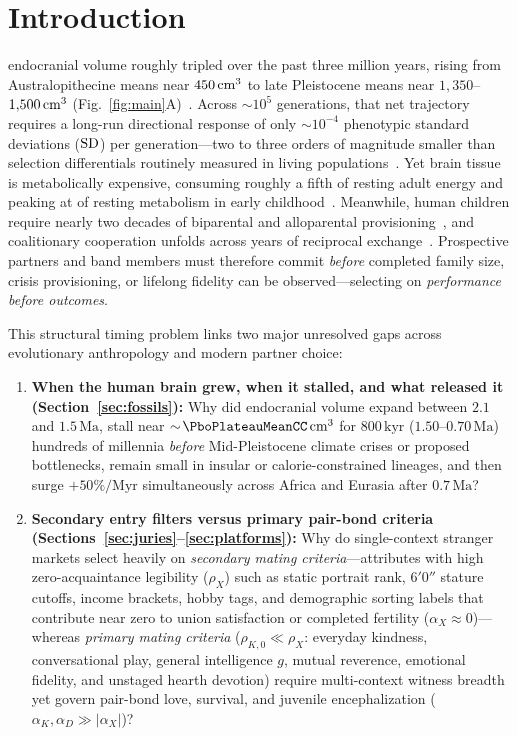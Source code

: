 
\section{Introduction}\label{sec:intro}

 endocranial volume roughly tripled over the past three million years, rising from Australopithecine means near $450\,\text{cm}^3$ to late Pleistocene means near $1{,}350$--$1{,}500\,\text{cm}^3$ (Fig.~\ref{fig:main}A)~\cite{du2018,will2021,gingerich2022}. Across $\sim\!10^5$ generations, that net trajectory requires a long-run directional response of only $\sim\!10^{-4}$ phenotypic standard deviations ($\operatorname{SD}$) per generation---two to three orders of magnitude smaller than selection differentials routinely measured in living populations~\cite{kingsolver2001}. Yet brain tissue is metabolically expensive, consuming roughly a fifth of resting adult energy and peaking at \PboChildPeakRmr{} of resting metabolism in early childhood~\cite{pontzer2016,kuzawa2014}. Meanwhile, human children require nearly two decades of biparental and alloparental provisioning~\cite{kaplan2000,marlowe2000}, and coalitionary cooperation unfolds across years of reciprocal exchange~\cite{boehm1999,gurven2004}. Prospective partners and band members must therefore commit \emph{before} completed family size, crisis provisioning, or lifelong fidelity can be observed---selecting on \emph{performance before outcomes}.

This structural timing problem links two major unresolved gaps across evolutionary anthropology and modern partner choice:
\begin{enumerate}[leftmargin=1.4em,itemsep=1.5pt,topsep=2pt]
\item \textbf{When the human brain grew, when it stalled, and what released it (Section~\ref{sec:fossils}):} Why did endocranial volume expand between $2.1$ and $1.5\,\mathrm{Ma}$, stall near $\sim\!\PboPlateauMeanCC\ccm$ for $800\,\mathrm{kyr}$ ($1.50$--$0.70\,\mathrm{Ma}$) hundreds of millennia \emph{before} Mid-Pleistocene climate crises or proposed bottlenecks, remain small in insular or calorie-constrained \Homo{} lineages, and then surge $+50\%/\mathrm{Myr}$ simultaneously across Africa and Eurasia after $0.7\,\mathrm{Ma}$?
\item \textbf{Secondary entry filters versus primary pair-bond criteria (Sections~\ref{sec:juries}--\ref{sec:platforms}):} Why do single-context stranger markets select heavily on \emph{secondary mating criteria}---attributes with high zero-acquaintance legibility ($\rho_X$) such as static portrait rank, $6'0''$ stature cutoffs, income brackets, hobby tags, and demographic sorting labels that contribute near zero to union satisfaction or completed fertility ($\alpha_X\approx 0$)---whereas \emph{primary mating criteria} ($\rho_{K,0}\ll\rho_X$: everyday kindness, conversational play, general intelligence $g$, mutual reverence, emotional fidelity, and unstaged hearth devotion) require multi-context witness breadth yet govern pair-bond love, survival, and juvenile encephalization ($\alpha_K,\alpha_D\gg|\alpha_X|$)?
\end{enumerate}

